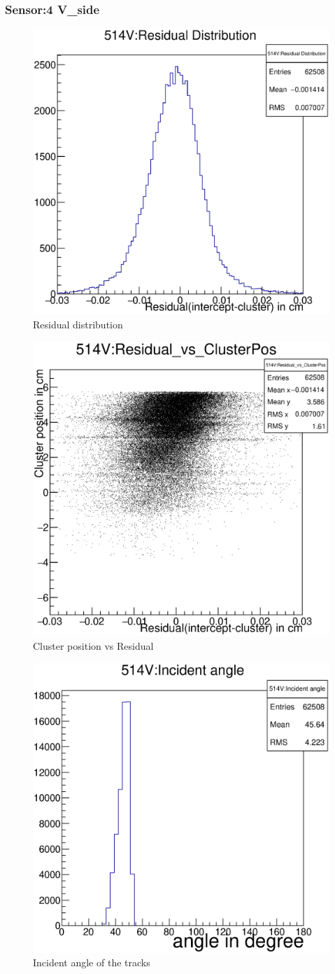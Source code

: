 \documentclass[12pt]{article}
\begin{document}
						\subsubsection{Sensor:4 V\_side}
						\begin{multicols}{3}
							\begin{figure}[H]
								\includegraphics[width=.3\textwidth]{514V:residualplot.eps}	
								\caption{Residual distribution}	
								\label{fig1}	
							\end{figure}
							\begin{figure}[H]
								\includegraphics[width=.3\textwidth]{514V:residual_vs_clusterpos.eps}	
								\caption{Cluster position vs Residual}	
								\label{fig2}	
							\end{figure}
							\begin{figure}[H]
								\includegraphics[width=.3\textwidth]{514V:incident_angle.eps}	
								\caption{Incident angle of the tracks}	
								\label{fig2}	
							\end{figure}
						\end{multicols}
						
\end{document}
